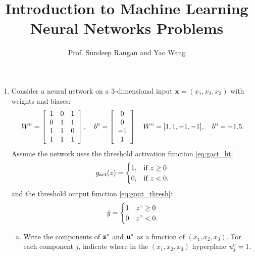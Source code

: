 \documentclass[11pt]{article}
\def\beq{\begin{equation}}
\def\eeq{\end{equation}}
\newcommand{\ubf}{\mathbf{u}}
\newcommand{\xbf}{\mathbf{x}}
\newcommand{\zbf}{\mathbf{z}}
\def\hid{\textsc{\tiny H}}
\def\out{\textsc{\tiny O}}
\begin{document}
\title{Introduction to Machine Learning\\
Neural Networks Problems}
\author{Prof. Sundeep Rangan and Yao Wang}
\date{}

\maketitle


\begin{enumerate}



\item Consider a neural network
on a 3-dimensional input $\xbf=(x_1,x_2, x_3)$ with weights and biases:
\[
    W^\hid = \left[ \begin{array}{ccc} 1 & 0 & 1  \\ 0 & 1  & 1 \\ 1 & 1 & 0 \\ 1 & 1 & 1\\ \end{array} \right], \quad
    b^\hid = \left[ \begin{array}{c} 0 \\ 0 \\ -1 \\ 1 \end{array} \right] \quad
    W^\out = [1, 1, -1, -1], \quad b^\out = -1.5.
\]
Assume the network uses the
threshold activation function \eqref{eq:gact_ht}
\beq \label{eq:gact_ht}
    g_{\rm act}(z) = \begin{cases}
        1, & \mbox{if } z \geq 0 \\
        0, & \mbox{if } z < 0.
        \end{cases}
\eeq
 and the
threshold output function \eqref{eq:gout_thresh}:
\beq \label{eq:gout_thresh}
    \hat{y} =  \begin{cases}
        1 & z^\out \geq 0 \\
        0 & z^\out < 0.
        \end{cases}
\eeq



\begin{enumerate}[(a)]
\item Write the components of $\zbf^\hid$ and $\ubf^\hid$ as a function
of $(x_1,x_2, x_3)$.  For each component $j$, indicate where in the $(x_1,x_2, x_3)$
hyperplane $u^\hid_j=1$.


\end{enumerate}
\end{enumerate}
\end{document}
